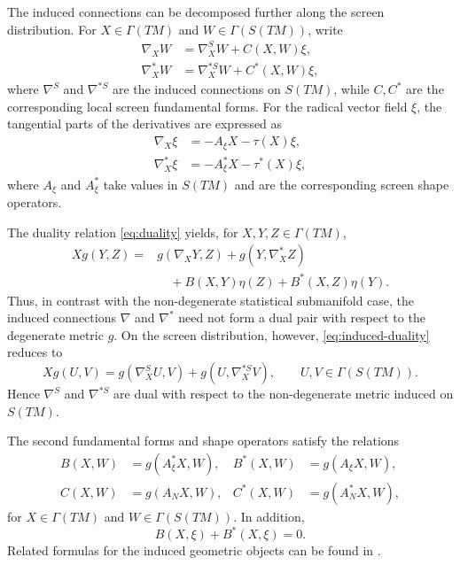 \documentclass[11pt,a4paper]{article}
\theoremstyle{remark}
\theoremstyle{definition}
\begin{document}
The induced connections can be decomposed further along the screen
distribution. For $X\in\Gamma(TM)$ and $W\in\Gamma(S(TM))$, write
\begin{align}
\nabla_{X}W
&=
\nabla^{S}_{X}W+C(X,W)\xi,
\label{eq:screen-gauss}\\
\nabla^{*}_{X}W
&=
\nabla^{*S}_{X}W+C^{*}(X,W)\xi,
\label{eq:screen-gauss-star}
\end{align}
where $\nabla^{S}$ and $\nabla^{*S}$ are the induced connections on $S(TM)$,
while $C,C^{*}$ are the corresponding local screen fundamental forms.
For the radical vector field $\xi$, the tangential parts of the
derivatives are expressed as
\begin{align}
\nabla_{X}\xi
&=
-A_{\xi}X-\tau(X)\xi,
\label{eq:xi-derivative}\\
\nabla^{*}_{X}\xi
&=
-A^{*}_{\xi}X-\tau^{*}(X)\xi,
\label{eq:xi-derivative-star}
\end{align}
where $A_{\xi}$ and $A^{*}_{\xi}$ take values in $S(TM)$ and are the
corresponding screen shape operators.

The duality relation \eqref{eq:duality} yields, for
$X,Y,Z\in\Gamma(TM)$,
\begin{align}
Xg(Y,Z)
={}&
g(\nabla_{X}Y,Z)
+
g(Y,\nabla^{*}_{X}Z) \nonumber\\
&\quad
+B(X,Y)\eta(Z)
+
B^{*}(X,Z)\eta(Y).
\label{eq:induced-duality}
\end{align}
Thus, in contrast with the non-degenerate statistical submanifold case,
the induced connections $\nabla$ and $\nabla^{*}$ need not form a dual
pair with respect to the degenerate metric $g$. On the screen
distribution, however, \eqref{eq:induced-duality} reduces to
\begin{equation}\label{eq:screen-duality}
Xg(U,V)
=
g(\nabla^{S}_{X}U,V)
+
g(U,\nabla^{*S}_{X}V),
\qquad
U,V\in\Gamma(S(TM)).
\end{equation}
Hence $\nabla^{S}$ and $\nabla^{*S}$ are dual with respect to the
non-degenerate metric induced on $S(TM)$.

The second fundamental forms and shape operators satisfy the relations
\begin{align}
B(X,W)
&=
g(A^{*}_{\xi}X,W),
&
B^{*}(X,W)
&=
g(A_{\xi}X,W),
\label{eq:B-shape}\\
C(X,W)
&=
g(A_{N}X,W),
&
C^{*}(X,W)
&=
g(A^{*}_{N}X,W),
\label{eq:C-shape}
\end{align}
for $X\in\Gamma(TM)$ and $W\in\Gamma(S(TM))$. In addition,
\begin{equation}\label{eq:B-xi}
B(X,\xi)+B^{*}(X,\xi)=0.
\end{equation}
Related formulas for the induced geometric objects can be found in
\cite{JainSinghKumar2020,KazemiSalahvarzi2020,RaniKaur2021,
BahadirTripathi2023}.
\end{document}
